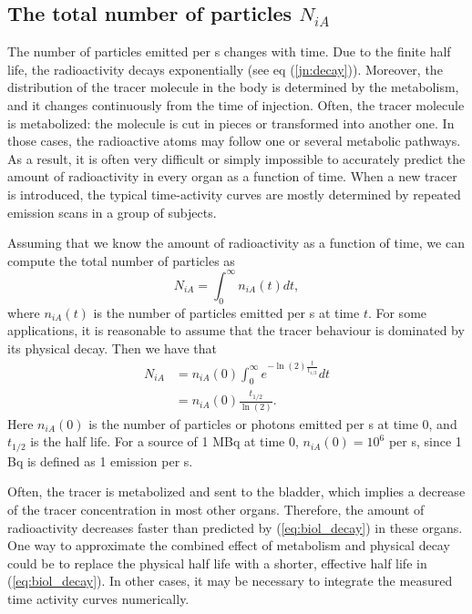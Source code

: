 \documentclass[11pt,oneside]{article}
\begin{document}
\subsection{The total number of particles $N_{iA}$}
The number of particles emitted per s changes with time. Due to the finite
half life, the radioactivity decays exponentially (see eq
(\ref{jn:decay})). Moreover, the distribution of the tracer molecule in the
body is determined by the metabolism, and it changes continuously from the
time of injection. Often, the tracer molecule is metabolized: the molecule is
cut in pieces or transformed into another one. In those cases, the radioactive
atoms may follow one or several metabolic pathways. As a result, it is often
very difficult or simply impossible to accurately predict the amount of
radioactivity in every organ as a function of time. When a new tracer is
introduced, the typical time-activity curves are mostly determined by repeated
emission scans in a group of subjects.

Assuming that we know the amount of radioactivity as a function of time, we
can compute the total number of particles as
\begin{equation}
  N_{iA} =  \int_0^{\infty} n_{iA}(t) dt,
\end{equation}
where $n_{iA}(t)$ is the number of particles emitted per s at time $t$.
For some applications, it is reasonable to assume that the tracer behaviour is
dominated by its physical decay. Then we have that
\begin{align}
  N_{iA} &= n_{iA}(0) \int_0^{\infty} e^{- \ln(2) \frac{t}{t_{1/2}}} dt \nonumber\\
         &= n_{iA}(0) \frac{t_{1/2}}{\ln(2)}. \label{eq:biol_decay}
\end{align}
Here $n_{iA}(0)$ is the number of particles or photons emitted per s at time
0, and $t_{1/2}$ is the half life.
For a source of 1 MBq at time 0, $n_{iA}(0) = 10^6$ per s, since 1 Bq is
defined as 1 emission per s.

Often, the tracer is metabolized and sent to the bladder, which implies a
decrease of the tracer concentration in most other organs. Therefore,
the amount of radioactivity decreases faster than predicted by
(\ref{eq:biol_decay}) in these organs. One way to approximate the combined
effect of metabolism and physical decay could be to replace the physical
half life with a shorter, effective half life in (\ref{eq:biol_decay}).
In other cases, it may
be necessary to integrate the measured time activity curves numerically.
\end{document}

